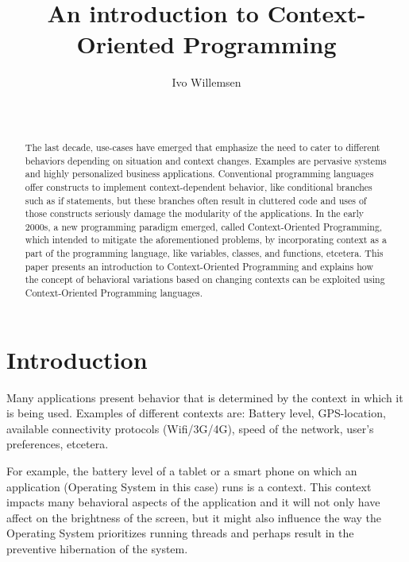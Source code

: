 \documentclass{acm_proc_article-sp}
\begin{document}
\title{An introduction to Context-Oriented Programming}

\author{
\alignauthor
Ivo Willemsen\\
       \\
       \\
}

\maketitle
\begin{abstract}
The last decade, use-cases have emerged that emphasize the need to cater to different behaviors depending on situation and context changes. Examples are pervasive systems and highly personalized business applications. Conventional programming languages offer constructs to implement context-dependent behavior, like  conditional branches such as if statements, but these branches often result in cluttered code and uses of those 
constructs seriously damage the modularity of the applications. In the early 2000s, a new programming paradigm emerged, called Context-Oriented Programming, which intended to mitigate the aforementioned problems, by incorporating context as a part of the programming language, like variables, classes, and functions, etcetera. This paper presents an introduction to Context-Oriented Programming and explains how the concept of behavioral variations based on changing contexts can be exploited using Context-Oriented Programming languages.
\end{abstract}


\section{Introduction} \label{introduction}
Many applications present behavior that is determined by the context in which it is being used. Examples of different contexts are: Battery level, GPS-location, available connectivity protocols (Wifi/3G/4G), speed of the network, user's preferences, etcetera.

For example, the battery level of a tablet or a smart phone on which an application (Operating System in this case) runs is a context. This context impacts many behavioral aspects of the application and it will not only have affect on the brightness of the screen, but it might also influence the way the Operating System prioritizes running threads and perhaps result in the preventive hibernation of the system.
\end{document}

